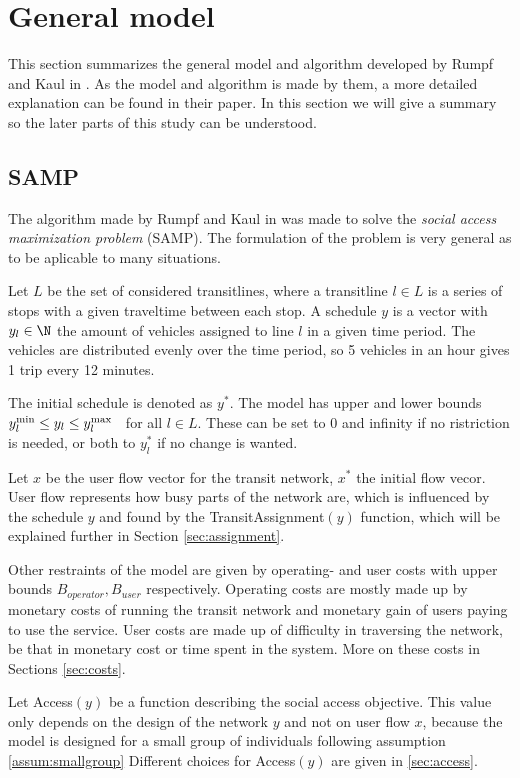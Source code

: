 \section{General model}\label{sec:generalmodel}
This section summarizes the general model and algorithm developed by Rumpf and Kaul in \cite{rumpf}. As the model and algorithm is made by them, a more detailed explanation can be found in their paper. In this section we will give a summary so the later parts of this study can be understood.
\subsection{SAMP}
The algorithm made by Rumpf and Kaul in \cite{rumpf} was made to solve the \emph{social access maximization problem} (SAMP). The formulation of the problem is very general as to be aplicable to many situations.

Let $L$ be the set of considered transitlines, where a transitline $l\in L$ is a series of stops with a given traveltime between each stop. A schedule $y$ is a vector with $y_l \in \N$ the amount of vehicles assigned to line $l$ in a given time period. The vehicles are distributed evenly over the time period, so 5 vehicles in an hour gives 1 trip every 12 minutes.

The initial schedule is denoted as $y^*$. The model has upper and lower bounds $y_l^{\text{min}} \leq y_l \leq y_l^{\text{max}} \hspace{2mm}$ for all $l\in L$. These can be set to 0 and infinity if no ristriction is needed, or both to $y^*_l$ if no change is wanted.

Let $x$ be the user flow vector for the transit network, $x^*$ the initial flow vecor. User flow represents how busy parts of the network are, which is influenced by the schedule $y$ and found by the TransitAssignment$(y)$ function, which will be explained further in Section \ref{sec:assignment}.

Other restraints of the model are given by operating- and user costs with upper bounds $B_{operator},B_{user}$ respectively. Operating costs are mostly made up by monetary costs of running the transit network and monetary gain of users paying to use the service. User costs are made up of difficulty in traversing the network, be that in monetary cost or time spent in the system. More on these costs in Sections \ref{sec:costs}.

Let Access$(y)$ be a function describing the social access objective. This value only depends on the design of the network $y$ and not on user flow $x$, because the model is designed for a small group of individuals following assumption \ref{assum:smallgroup} Different choices for Access$(y)$ are given in \ref{sec:access}.

